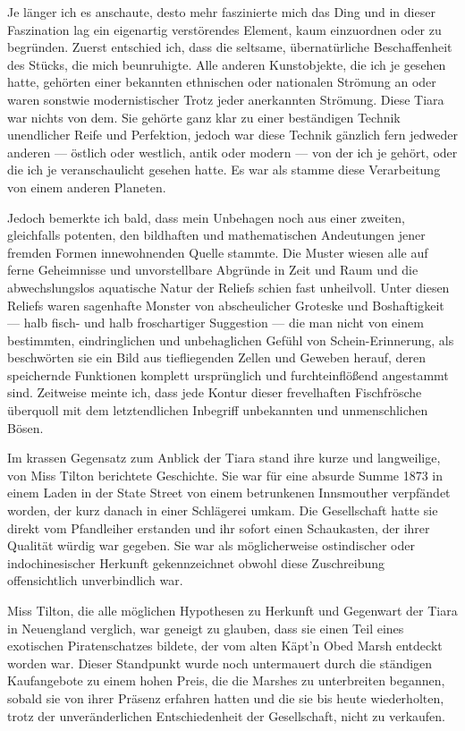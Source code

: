 Je länger ich es anschaute, desto mehr faszinierte mich das Ding und in dieser Faszination lag ein eigenartig verstörendes Element, kaum einzuordnen oder zu begründen. Zuerst entschied ich, dass die seltsame, übernatürliche Beschaffenheit des Stücks, die mich beunruhigte. Alle anderen Kunstobjekte, die ich je gesehen hatte, gehörten einer bekannten ethnischen oder nationalen Strömung an oder waren sonstwie modernistischer Trotz jeder anerkannten Strömung. Diese Tiara war nichts von dem. Sie gehörte ganz klar zu einer beständigen Technik unendlicher Reife und Perfektion, jedoch war diese Technik gänzlich fern jedweder anderen --- östlich oder westlich, antik oder modern --- von der ich je gehört, oder die ich je veranschaulicht gesehen hatte. Es war als stamme diese Verarbeitung von einem anderen Planeten.

Jedoch bemerkte ich bald, dass mein Unbehagen noch aus einer zweiten, gleichfalls potenten, den bildhaften und mathematischen Andeutungen jener fremden Formen innewohnenden Quelle stammte. Die Muster wiesen alle auf ferne Geheimnisse und unvorstellbare Abgründe in Zeit und Raum und die abwechslungslos aquatische Natur der Reliefs schien fast unheilvoll. Unter diesen Reliefs waren sagenhafte Monster von abscheulicher Groteske und Boshaftigkeit --- halb fisch- und halb froschartiger Suggestion --- die man nicht von einem bestimmten, eindringlichen und unbehaglichen Gefühl von Schein-Erinnerung, als beschwörten sie ein Bild aus tiefliegenden Zellen und Geweben herauf, deren speichernde Funktionen komplett ursprünglich und furchteinflößend angestammt sind. Zeitweise meinte ich, dass jede Kontur dieser frevelhaften Fischfrösche überquoll mit dem letztendlichen Inbegriff unbekannten und unmenschlichen Bösen.

Im krassen Gegensatz zum Anblick der Tiara stand ihre kurze und langweilige, von Miss Tilton berichtete Geschichte. Sie war für eine absurde Summe 1873 in einem Laden in der State Street von einem betrunkenen Innsmouther verpfändet worden, der kurz danach in einer Schlägerei umkam. Die Gesellschaft hatte sie direkt vom Pfandleiher erstanden und ihr sofort einen Schaukasten, der ihrer Qualität würdig war gegeben. Sie war als möglicherweise ostindischer oder indochinesischer Herkunft gekennzeichnet obwohl diese Zuschreibung offensichtlich unverbindlich war.

Miss Tilton, die alle möglichen Hypothesen zu Herkunft und Gegenwart der Tiara in Neuengland verglich, war geneigt zu glauben, dass sie einen Teil eines exotischen Piratenschatzes bildete, der vom alten Käpt'n Obed Marsh entdeckt worden war. Dieser Standpunkt wurde noch untermauert durch die ständigen Kaufangebote zu einem hohen Preis, die die Marshes zu unterbreiten begannen, sobald sie von ihrer Präsenz erfahren hatten und die sie bis heute wiederholten, trotz der unveränderlichen Entschiedenheit der Gesellschaft, nicht zu verkaufen.

